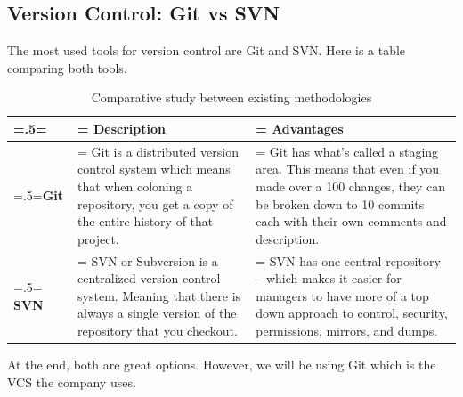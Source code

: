 \subsection{Version Control: Git vs SVN}
The most used tools for version control are Git and SVN. Here is a table comparing both tools.
\begin{table}[H]
	\renewcommand{\arraystretch}{1.5}%
	\caption{Comparative study between existing methodologies}
	\centering
	\medskip
	\begin{tabularx}{1\textwidth} {
			| >{\hsize=.5\hsize\linewidth=\hsize\centering\arraybackslash}X
			| >{\hsize=1.25\hsize\linewidth=\hsize\centering\arraybackslash}X
			| >{\hsize=1.25\hsize\linewidth=\hsize\centering\arraybackslash}X |}
		\hline
		\rowcolor{primary} & \textbf {Description}                                                                                                                          & \textbf {Advantages}                                                                                                                                                           \\
		\hline
		\textbf{Git}       & Git is a distributed version control system which means that when coloning a repository, you get a copy of the entire history of that project. & Git has what's called a staging area. This means that even if you made over a 100 changes, they can be broken down to 10 commits each with their own comments and description. \\
		\hline
		\textbf{SVN}       & SVN or Subversion is a centralized version control system. Meaning that there is always a single version of the repository that you checkout.  & SVN has one central repository – which makes it easier for managers to have more of a top down approach to control, security, permissions, mirrors, and dumps.                 \\
		\hline
	\end{tabularx}
\end{table}
At the end, both are great options. However, we will be using Git which is the VCS the company uses.

